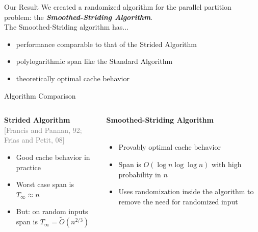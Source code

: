 \documentclass[xcolor=x11names, svgnames, rgb]{beamer}
\newcommand{\defn}[1]       {{\textit{\textbf{\boldmath #1}}}}
\newcommand{\citefont}[1]{{\tiny \textcolor{Gray}{#1}}}
\begin{document}
\begin{frame}[t]{Our Result}
	We created a randomized algorithm for the parallel partition problem: the \defn{Smoothed-Striding Algorithm}.\\
	\vspace{0.5cm}
	The Smoothed-Striding algorithm has...
	\begin{itemize}
		\item performance comparable to that of the Strided Algorithm
		\item polylogarithmic span like the Standard Algorithm
		\item theoretically optimal cache behavior 
	\end{itemize}
\end{frame}


\begin{frame}[t]{Algorithm Comparison}
	\begin{columns}[T] %
	\begin{column}{.45\textwidth}
		\textbf{Strided Algorithm}\\\citefont{[Francis and Pannan, 92; Frias and Petit, 08]}\\
		\vspace{0.25cm}
		\begin{itemize}
			\item Good cache behavior in practice\\\hfill
			\item Worst case span is $T_\infty \approx n$\\\hfill
			\item But: on random inputs span is $T_\infty = \tilde{O}(n^{2/3})$
		\end{itemize}
	\end{column}
	\hfill
	\begin{column}{.55\textwidth}
		\textbf{Smoothed-Striding Algorithm}\\\citefont{}\\
		\vspace{0.25cm}
		\begin{itemize}
			\item Provably optimal cache behavior\\\hfill
			\item Span is $O(\log n \log\log n)$ with high probability in $n$\\\hfill
			\item Uses randomization inside the algorithm to remove the need for randomized input
		\end{itemize}
	\end{column}
	\end{columns}
\end{frame}
\end{document}
